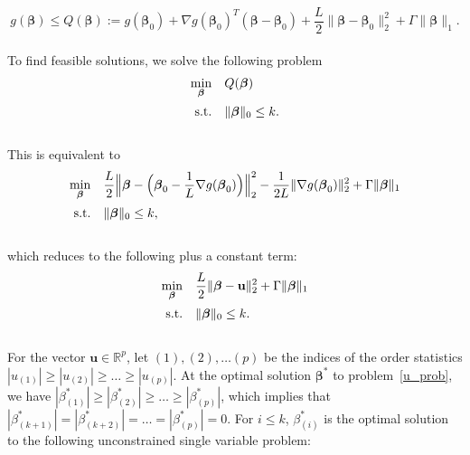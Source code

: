 \documentclass[12pt]{article}
\newcommand{\M}{\mathbf}
\newcommand{\MS}{\boldsymbol}
\newcommand{\R}{\mathbb{R}}
\newcommand{\1}{\mathds{1}}
\begin{document}
\begin{equation}
g(\MS \beta) \le Q(\MS \beta) := g(\MS \beta_0) + \nabla g(\MS \beta_0)^T(\MS \beta - \MS \beta_0) + \frac{L}{2} \|\MS \beta - \MS \beta_0\|_2^2 + \Gamma \| \MS \beta \|_1.
\end{equation}\\

To find feasible solutions, we solve the following problem
\begin{equation}
\begin{array}{rll}
  \min \limits_{\MS \beta} & Q(\MS \beta) \vspace{5pt}\\
  \text{s.t.} & \| \MS \beta \|_0 \le k.
\end{array}
\end{equation}\\

This is equivalent to
\begin{equation}
\begin{array}{rll}
  \min \limits_{\MS \beta} & \displaystyle \frac{L}{2}\Big\|\MS \beta - \Big(\MS \beta_0 - \frac{1}{L} \nabla g(\MS \beta_0)\Big) \Big\|_2^2 - \frac{1}{2L} \|\nabla g(\MS \beta_0) \|_2^2 + \Gamma \| \MS \beta \|_1 \vspace{5pt}\\
  \text{s.t.} & \| \MS \beta \|_0 \le k,
\end{array}
\end{equation}\\

which reduces to the following plus a constant term:
\begin{equation}
\label{u_prob}
\begin{array}{rll}
  \min \limits_{\MS \beta} & \displaystyle \frac{L}{2}\|\MS \beta - \M u \|_2^2 + \Gamma \| \MS \beta \|_1 \vspace{5pt}\\
  \text{s.t.} & \| \MS \beta \|_0 \le k.
\end{array}
\end{equation}\\

For the vector $\M u \in \R^p$, let $(1), (2), \ldots (p)$ be the indices of the order statistics $|u_{(1)}| \ge |u_{(2)}| \ge \ldots \ge |u_{(p)}|$.  At the optimal solution $\MS \beta^*$ to problem~\ref{u_prob}, we have $|\beta_{(1)}^*| \ge |\beta_{(2)}^*| \ge \ldots \ge |\beta_{(p)}^*|$, which implies that $|\beta_{(k+1)}^*| = |\beta_{(k + 2)}^*| = \ldots = |\beta_{(p)}^*| = 0$.  For $i \le k$, $\beta_{(i)}^*$ is the optimal solution to the following unconstrained single variable problem:
\end{document}
